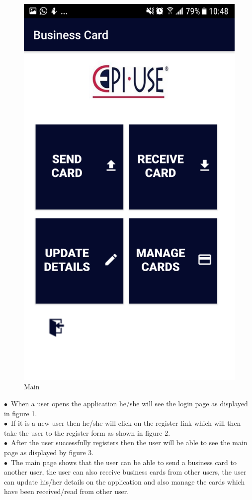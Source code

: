 \documentclass[english]{article}
\begin{document}
\begin{figure}[!htb]
  \includegraphics[width=\linewidth]{Main.png}
  \caption{Main}\label{Main}
\endminipage
\end{figure}

								
$\bullet$\ When a user opens the application he/she will see the login page as displayed in figure 1.\\$\bullet$\ If it is a new user then he/she will click on the register link which will then take the user to the register form as shown in figure 2.\\$\bullet$\ After the user successfully registers then the user will be able to see the main page as displayed by figure 3.\\$\bullet$\ The main page shows that the user can be able to send a business card to another user, the user can also receive business cards from other users, the user can update his/her details on the application and also manage the cards which have been received/read from other user.
\end{document}
